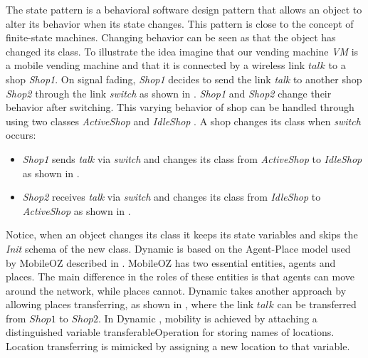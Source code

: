 The state pattern is a behavioral software design pattern that allows an object to alter its behavior when its state changes. This pattern is close to the concept of finite-state machines. Changing behavior can be seen as that the object has changed its class. To illustrate the idea imagine that our vending machine \textit{VM} is a mobile vending machine and that it is connected by a wireless link $talk$ to a shop \textit{Shop1}. On signal fading, \textit{Shop1} decides to send the link \textit{talk} to another shop \textit{Shop2} through the link \textit{switch} as shown in . \textit{Shop1} and \textit{Shop2} change their behavior after switching. This varying behavior of shop can be handled through using two classes \textit{ActiveShop} and \textit{IdleShop} . A shop changes its class when \textit{switch} occurs:
\begin{itemize}
\item \textit{Shop1} sends \textit{talk} via \textit{switch} and changes its class from \textit{ActiveShop} to \textit{IdleShop} as shown in .
\item \textit{Shop2} receives \textit{talk} via  \textit{switch} and changes its class from \textit{IdleShop} to \textit{ActiveShop} as shown in .
\end{itemize}
Notice, when an object changes its class it keeps its state variables and skips the \textit{Init} schema of the new class.
Dynamic \oz{} is based on the Agent-Place model used by MobileOZ described in \cite{Kenji2}. MobileOZ has two
essential entities, agents and places. The main difference in the roles of these entities is that agents can move around the network, while places cannot. Dynamic \oz{} takes another approach by allowing places transferring, as shown in , where the link $talk$ can be transferred from $Shop1$ to $Shop2$. In Dynamic \oz{}, mobility is achieved
by attaching a distinguished variable transferableOperation for storing names of locations. Location transferring
is mimicked by assigning a new location to that variable.


